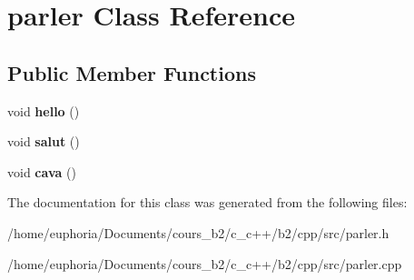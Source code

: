 \hypertarget{classparler}{}\section{parler Class Reference}
\label{classparler}
\subsection*{Public Member Functions}
\begin{DoxyCompactItemize}
\item 
void {\bfseries hello} ()\hypertarget{classparler_ad25d440097a6d50dc72593642fda27a3}{}\label{classparler_ad25d440097a6d50dc72593642fda27a3}

\item 
void {\bfseries salut} ()\hypertarget{classparler_aae4440bc6916955fab50664180aea610}{}\label{classparler_aae4440bc6916955fab50664180aea610}

\item 
void {\bfseries cava} ()\hypertarget{classparler_ab30fe9a7894e40dc3b7540b686540461}{}\label{classparler_ab30fe9a7894e40dc3b7540b686540461}

\end{DoxyCompactItemize}


The documentation for this class was generated from the following files\+:\begin{DoxyCompactItemize}
\item 
/home/euphoria/\+Documents/cours\+\_\+b2/c\+\_\+c++/b2/cpp/src/parler.\+h\item 
/home/euphoria/\+Documents/cours\+\_\+b2/c\+\_\+c++/b2/cpp/src/parler.\+cpp\end{DoxyCompactItemize}
